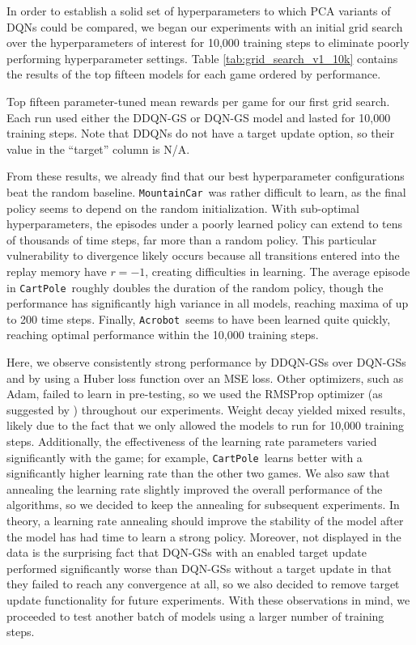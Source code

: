 \documentclass[11pt]{article}
\newcommand{\cp}{\texttt{CartPole}}
\newcommand{\ab}{\texttt{Acrobot}}
\newcommand{\mc}{\texttt{MountainCar}}
\begin{document}
In order to establish a solid set of hyperparameters to which PCA variants of DQNs could be compared, we began our experiments with an initial grid search over the hyperparameters of interest for 10,000 training steps to eliminate poorly performing hyperparameter settings. Table \ref{tab:grid_search_v1_10k} contains the results of the top fifteen models for each game ordered by performance.

\begin{table}[!ht]
    \footnotesize
    \centering
    
    
    \caption{Top fifteen parameter-tuned mean rewards per game for our first grid search. Each run used either the DDQN-GS or DQN-GS model and lasted for 10,000 training steps. Note that DDQNs do not have a target update option, so their value in the ``target'' column is N/A.}
    \label{tab:grid_search_v1_10k}
\end{table}

From these results, we already find that our best hyperparameter configurations beat the random baseline. \mc~was rather difficult to learn, as the final policy seems to depend on the random initialization. With sub-optimal hyperparameters, the episodes under a poorly learned policy can extend to tens of thousands of time steps, far more than a random policy. This particular vulnerability to divergence likely occurs because all transitions entered into the replay memory have $r = -1$, creating difficulties in learning. The average episode in \cp~roughly doubles the duration of the random policy, though the performance has significantly high variance in all models, reaching maxima of up to 200 time steps. Finally, \ab~seems to have been learned quite quickly, reaching optimal performance within the 10,000 training steps.

Here, we observe consistently strong performance by DDQN-GSs over DQN-GSs and by using a Huber loss function over an MSE loss. Other optimizers, such as Adam, failed to learn in pre-testing, so we used the RMSProp optimizer (as suggested by \cite{mnih2013playing}) throughout our experiments. Weight decay yielded mixed results, likely due to the fact that we only allowed the models to run for 10,000 training steps. Additionally, the effectiveness of the learning rate parameters varied significantly with the game; for example, \cp~learns better with a significantly higher learning rate than the other two games. We also saw that annealing the learning rate slightly improved the overall performance of the algorithms, so we decided to keep the annealing for subsequent experiments. In theory, a learning rate annealing should improve the stability of the model after the model has had time to learn a strong policy. Moreover, not displayed in the data is the surprising fact that DQN-GSs with an enabled target update performed significantly worse than DQN-GSs without a target update in that they failed to reach any convergence at all, so we also decided to remove target update functionality for future experiments. With these observations in mind, we proceeded to test another batch of models using a larger number of training steps. 
\end{document}
